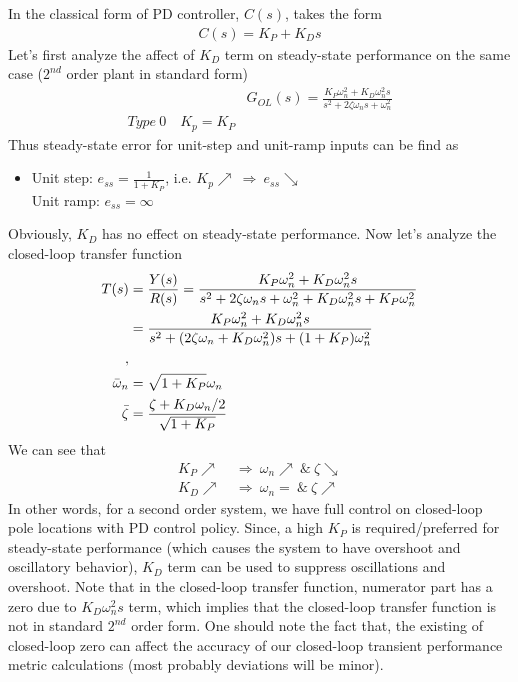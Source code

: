 \documentclass[twoside]{article}
\begin{document}
In the classical form of PD controller, $C(s)$, takes the form
%
\begin{align*}
 C(s) = K_P + K_D s
\end{align*}
%
Let's first analyze the affect of $K_D$ term on steady-state 
performance on the same case ($2^{nd}$ order plant in standard form) 
%
\begin{align*}
  &G_{OL}(s) = \frac{K_P \omega_n^2 + K_D \omega_n^2 s}{s^2 + 2 \zeta
    \omega_n s + \omega_n^2}
\\
 Type \ 0 \quad K_p = K_P
\end{align*}
% 
Thus steady-state error for unit-step and unit-ramp inputs can be find
as
\begin{itemize}
\item Unit step: $e_{ss} = \frac{1}{1 + K_P}$, i.e. $K_p \nearrow \
  \Rightarrow \ e_{ss} \searrow$  
\\ Unit ramp: $e_{ss} = \infty$
\end{itemize}
Obviously, $K_D$ has no effect on steady-state performance. Now
let's analyze the closed-loop transfer function
%
  \begin{align*}
  T(s) &= \frac{Y(s)}{R(s)} = \frac{K_P \omega_n^2 + K_D \omega_n^2 s}{s^2 + 2 \zeta
    \omega_n  s + \omega_n^2 + K_D \omega_n^2 s + K_P \omega_n^2}
\\
  &=   \frac{K_P \omega_n^2 + K_D \omega_n^2 s}{s^2 + ( 2 \zeta
    \omega_n + K_D \omega_n^2) s + (1 + K_P) \omega_n^2}
\\
,
\\
 \Bar{\omega}_n &= \sqrt{1 + K_P} \omega_n
\\
 \bar{\zeta} &= \frac{\zeta + K_D \omega_n / 2}{ \sqrt{ 1 + K_P} } 
  \end{align*}
%
We can see that
%
  \begin{align*}
    K_P \nearrow \ &\Rightarrow \ \omega_n \nearrow \ \& \ \zeta \searrow
\\
   K_D \nearrow \ &\Rightarrow \ \omega_n = \ \& \ \zeta \nearrow
  \end{align*}
%
In other words, for a second order system, we have full control on
closed-loop pole locations with PD control policy. Since, a high $K_P$
is required/preferred for steady-state performance (which causes 
the system to have overshoot and oscillatory behavior), $K_D$
term can be used to suppress oscillations and overshoot.
Note that in the closed-loop transfer function, numerator part
has a zero due to $K_D \omega_n^2 s$ term, which implies that
the closed-loop transfer function is not in standard $2^{nd}$ order
form. One should note the fact that, the existing of closed-loop
zero can affect the accuracy of our closed-loop transient performance
metric calculations (most probably deviations will be minor).
%
\end{document}
